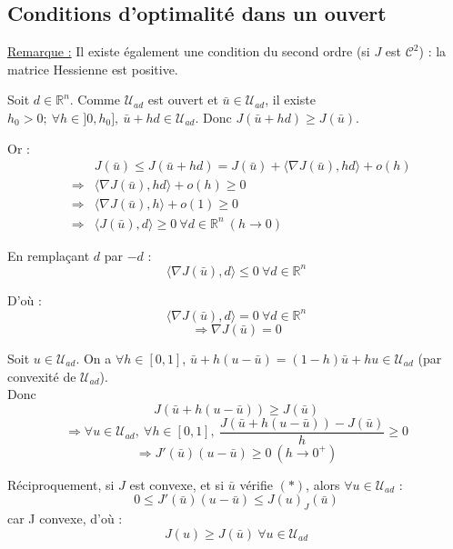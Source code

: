 \subsection{Conditions d'optimalité dans un ouvert}

\underline{Remarque :} Il existe également une condition du second ordre (si $J$ est $\mathcal{C}^2$) : la matrice Hessienne est positive.

\begin{dem}
Soit $d\in\mathbb{R}^n$. Comme $\mathcal{U}_{ad}$ est ouvert et $\bar{u}\in\mathcal{U}_{ad}$, il existe $h_0>0;\ \forall h\in]0,h_0],\ \bar{u}+hd\in\mathcal{U}_{ad}$. Donc $J(\bar{u}+hd)\geq J(\bar{u})$.

Or :
\begin{eqnarray*}
& & J(\bar{u})\leq J(\bar{u}+hd)=J(\bar{u})+\langle \nabla J(\bar{u}),hd\rangle + o(h) \\
&\Rightarrow& \langle\nabla J(\bar{u}), hd\rangle +o(h)\geq 0 \\
&\Rightarrow& \langle \nabla J(\bar{u}),h\rangle + o(1)\geq 0 \\
&\Rightarrow& \langle J(\bar{u}),d\rangle \geq 0\ \forall d\in\mathbb{R}^n\ (h\to 0)
\end{eqnarray*}

En remplaçant $d$ par $-d$ :
\[\langle\nabla J(\bar{u}),d\rangle\leq 0\ \forall d\in\mathbb{R}^n\]

D'où :
\[\langle \nabla J(\bar{u}),d\rangle =0\ \forall d\in\mathbb{R}^n\]
\[\Rightarrow \nabla J(\bar{u})=0\] 
\end{dem}


\begin{dem}
Soit $u\in\mathcal{U}_{ad}$. On a $\forall h\in[0,1]$, $\bar{u}+h(u-\bar{u})=(1-h)\bar{u}+hu\in\mathcal{U}_{ad}$ (par convexité de $\mathcal{U}_{ad}$). \\
Donc \[J(\bar{u}+h(u-\bar{u}))\geq J(\bar{u})\]
\[\Rightarrow \forall u\in\mathcal{U}_{ad},\ \forall h\in[0,1],\ \frac{J(\bar{u}+h(u-\bar{u}))-J(\bar{u})}{h}\geq 0\]
\[\Rightarrow J'(\bar{u})(u-\bar{u})\geq 0\ (h\to 0^+)\]

\bigskip
Réciproquement, si $J$ est convexe, et si $\bar{u}$ vérifie $(*)$, alors $\forall u\in\mathcal{U}_{ad}$ :
\[0\leq J'(\bar{u})(u-\bar{u})\leq J(u)_J(\bar{u})\]
car J convexe, d'où :
\[J(u)\geq J(\bar{u})\ \forall u\in\mathcal{U}_{ad}\]
\end{dem}

